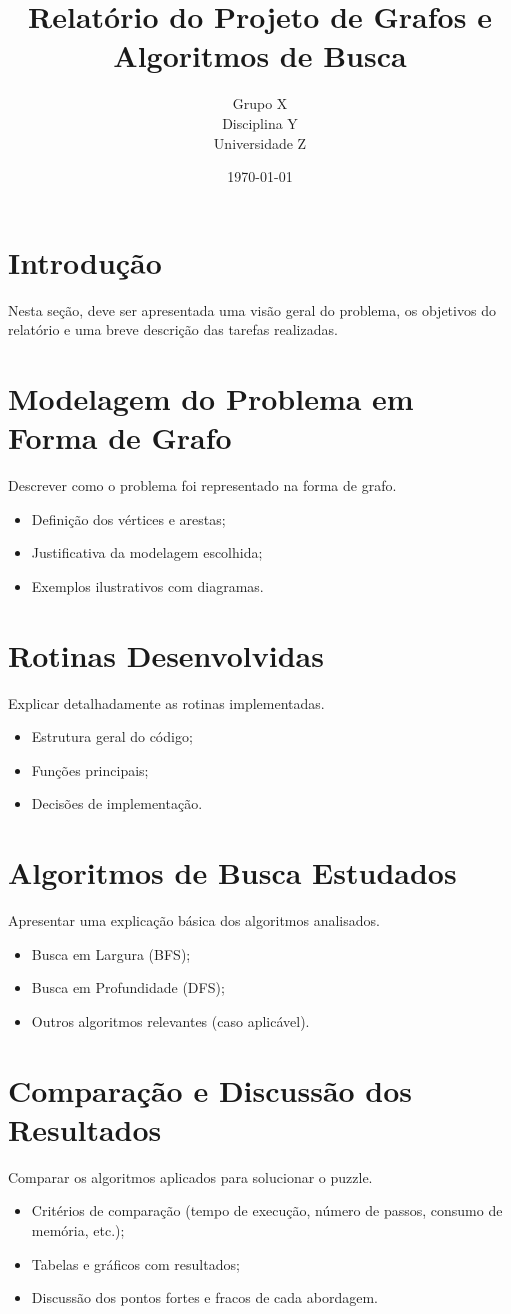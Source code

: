 \documentclass[12pt,a4paper]{article}
\title{Relatório do Projeto de Grafos e Algoritmos de Busca}
\author{Grupo X \\ Disciplina Y \\ Universidade Z}
\date{\today}
\begin{document}
\maketitle
\tableofcontents
\newpage

\section{Introdução}
Nesta seção, deve ser apresentada uma visão geral do problema, os objetivos do relatório e uma breve descrição das tarefas realizadas.

\section{Modelagem do Problema em Forma de Grafo}
Descrever como o problema foi representado na forma de grafo.  
\begin{itemize}
    \item Definição dos vértices e arestas;
    \item Justificativa da modelagem escolhida;
    \item Exemplos ilustrativos com diagramas.
\end{itemize}

\section{Rotinas Desenvolvidas}
Explicar detalhadamente as rotinas implementadas.  
\begin{itemize}
    \item Estrutura geral do código;
    \item Funções principais;
    \item Decisões de implementação.
\end{itemize}

\section{Algoritmos de Busca Estudados}
Apresentar uma explicação básica dos algoritmos analisados.  
\begin{itemize}
    \item Busca em Largura (BFS);
    \item Busca em Profundidade (DFS);
    \item Outros algoritmos relevantes (caso aplicável).
\end{itemize}

\section{Comparação e Discussão dos Resultados}
Comparar os algoritmos aplicados para solucionar o puzzle.  
\begin{itemize}
    \item Critérios de comparação (tempo de execução, número de passos, consumo de memória, etc.);
    \item Tabelas e gráficos com resultados;
    \item Discussão dos pontos fortes e fracos de cada abordagem.
\end{itemize}
\end{document}
